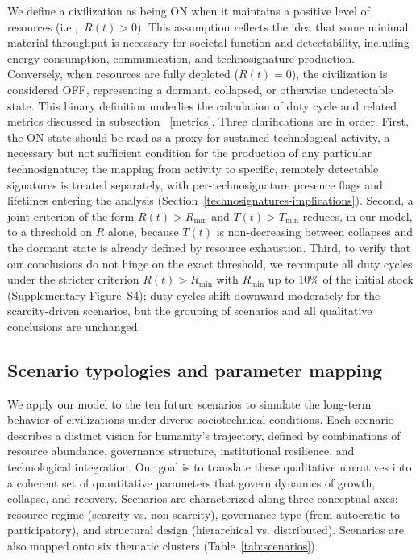 We define a civilization as being ON when it maintains a positive level of resources (i.e., \(\ R(t) > 0\)). This assumption reflects the idea that some minimal material throughput is necessary for societal function and detectability, including energy consumption, communication, and technosignature production. Conversely, when resources are fully depleted (\(R(t) = 0\)), the civilization is considered OFF, representing a dormant, collapsed, or otherwise undetectable state. This binary definition underlies the calculation of duty cycle and related metrics discussed in subsection ~\ref{metrics}. Three clarifications are in order. First, the ON state should be read as a proxy for sustained technological activity, a necessary but not sufficient condition for the production of any particular technosignature; the mapping from activity to specific, remotely detectable signatures is treated separately, with per-technosignature presence flags and lifetimes entering the analysis (Section~\ref{technosignatures-implications}). Second, a joint criterion of the form $R(t) > R_{\min}$ and $T(t) > T_{\min}$ reduces, in our model, to a threshold on $R$ alone, because $T(t)$ is non-decreasing between collapses and the dormant state is already defined by resource exhaustion. Third, to verify that our conclusions do not hinge on the exact threshold, we recompute all duty cycles under the stricter criterion $R(t) > R_{\min}$ with $R_{\min}$ up to 10\% of the initial stock (Supplementary Figure~S4); duty cycles shift downward moderately for the scarcity-driven scenarios, but the grouping of scenarios and all qualitative conclusions are unchanged.

\subsection{Scenario typologies and parameter mapping}\label{scenario-typologies-and-parameter-mapping}

We apply our model to the ten future scenarios to simulate the long-term behavior of civilizations under diverse sociotechnical conditions. Each scenario describes a distinct vision for humanity's trajectory, defined by combinations of resource abundance, governance structure, institutional resilience, and technological integration. Our goal is to translate these qualitative narratives into a coherent set of quantitative parameters that govern dynamics of growth, collapse, and recovery. Scenarios are characterized along three conceptual axes: resource regime (scarcity vs. non-scarcity), governance type (from autocratic to participatory), and structural design (hierarchical vs. distributed). Scenarios are also mapped onto six thematic clusters (Table~\ref{tab:scenarios}).

